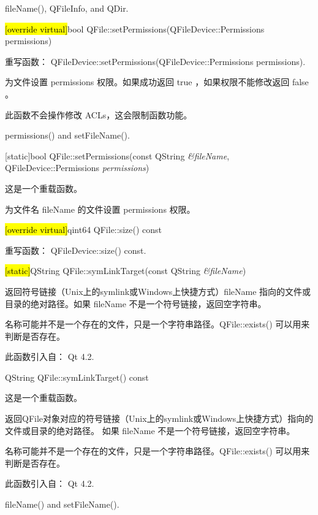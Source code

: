 \begin{notice}[另请参阅]
fileName(), QFileInfo, and QDir.
\end{notice}

\splitLine

\hl{[override virtual]}bool QFile::setPermissions(QFileDevice::Permissions permissions)

重写函数： QFileDevice::setPermissions(QFileDevice::Permissions permissions).

为文件设置 permissions 权限。如果成功返回 true ，如果权限不能修改返回 false 。



\begin{notice}[警告]
此函数不会操作修改 ACLs，这会限制函数功能。
\end{notice}

\begin{notice}[另请参阅]
permissions() and setFileName().
\end{notice}

\splitLine

[static]bool QFile::setPermissions(const QString \emph{\&fileName}, QFileDevice::Permissions \emph{permissions})

这是一个重载函数。

为文件名 fileName 的文件设置 permissions 权限。

\hl{[override virtual]}qint64 QFile::size() const

重写函数： QFileDevice::size() const.

\splitLine

\hl{[static]}QString QFile::symLinkTarget(const QString \emph{\&fileName})

返回符号链接（Unix上的symlink或Windows上快捷方式）fileName 指向的文件或目录的绝对路径。如果 fileName 不是一个符号链接，返回空字符串。

名称可能并不是一个存在的文件，只是一个字符串路径。QFile::exists() 可以用来判断是否存在。

此函数引入自： Qt 4.2.

\splitLine

QString QFile::symLinkTarget() const

这是一个重载函数。

返回QFile对象对应的符号链接（Unix上的symlink或Windows上快捷方式）指向的文件或目录的绝对路径。
如果 fileName 不是一个符号链接，返回空字符串。

名称可能并不是一个存在的文件，只是一个字符串路径。QFile::exists() 可以用来判断是否存在。

此函数引入自： Qt 4.2.

\begin{notice}[另请参阅]
fileName() and setFileName().
\end{notice}
